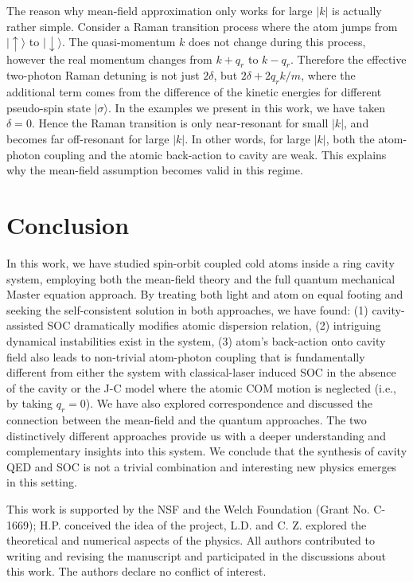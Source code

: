 \documentclass[atoms,article,submit,moreauthors,pdftex,12pt,a4paper]{mdpi}
\begin{document}
The reason why mean-field approximation only works for large $|k|$ is actually rather simple. Consider a Raman transition process where the atom jumps from $|\uparrow \rangle$ to $|\downarrow \rangle$. The quasi-momentum $k$ does not change during this process, however the real momentum changes from $k+q_r$ to $k-q_r$. Therefore the effective two-photon Raman detuning is not just $2\delta$, but $2\delta +2q_rk/m$, where the additional term comes from the difference of the kinetic energies for different pseudo-spin state $|\sigma\rangle$. In the examples we present in this work, we have taken $\delta=0$. Hence the Raman transition is only near-resonant for small $|k|$, and becomes far off-resonant for large $|k|$. In other words, for  large $|k|$, both the atom-photon coupling and the atomic back-action to cavity are weak. This explains why the mean-field assumption becomes valid in this regime.   


\section{Conclusion} \label{conclusion}

In this work, we have studied spin-orbit coupled cold atoms inside a ring cavity system, employing both the mean-field theory and the full quantum mechanical Master equation approach. By treating both light and atom on equal footing and seeking the self-consistent solution in both approaches, we have found: (1) cavity-assisted SOC dramatically modifies atomic dispersion relation, (2) intriguing dynamical instabilities exist in the system, (3) atom's back-action onto cavity field also leads to non-trivial atom-photon coupling that is fundamentally different from either the system with classical-laser induced SOC in the absence of the cavity or the J-C model where the atomic COM motion is neglected (i.e., by taking $q_r=0$). We have also explored correspondence and discussed the connection between the mean-field and the quantum approaches. The two distinctively different approaches provide us with a deeper understanding and complementary insights into this system. We conclude that the synthesis of cavity QED and SOC is not a trivial combination and interesting new physics emerges in this setting.



This work is supported by the NSF and the Welch Foundation (Grant No. C-1669);
H.P. conceived the idea of the project, L.D. and C. Z. explored the theoretical and numerical aspects of the physics. All authors contributed to writing and revising the manuscript and participated in the discussions about this work.
The authors declare no conflict of interest. 
\end{document}
